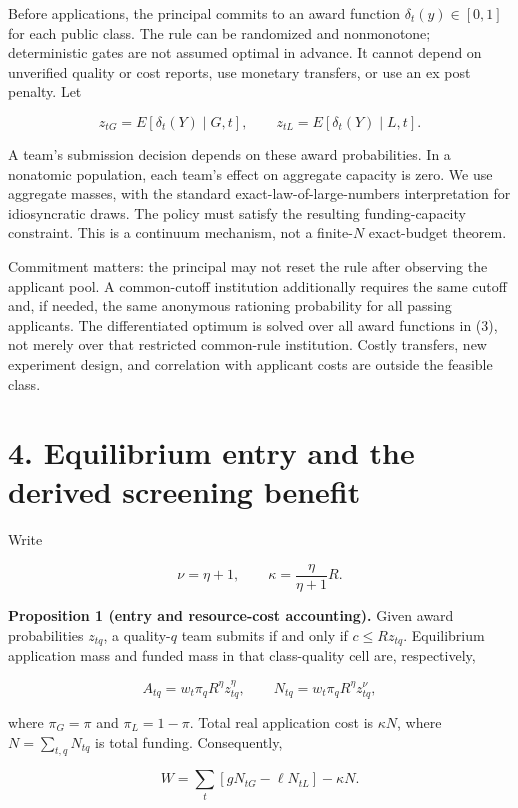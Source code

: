 \documentclass[
  11pt,
]{article}
\begin{document}
Before applications, the principal commits to an award function
\(\delta_t(y)\in[0,1]\) for each public class. The rule can be
randomized and nonmonotone; deterministic gates are not assumed optimal
in advance. It cannot depend on unverified quality or cost reports, use
monetary transfers, or use an ex post penalty. Let

\[z_{tG}=E[\delta_t(Y)\mid G,t],\qquad
z_{tL}=E[\delta_t(Y)\mid L,t]. \tag{3}\]

A team's submission decision depends on these award probabilities. In a
nonatomic population, each team's effect on aggregate capacity is zero.
We use aggregate masses, with the standard exact-law-of-large-numbers
interpretation for idiosyncratic draws. The policy must satisfy the
resulting funding-capacity constraint. This is a continuum mechanism,
not a finite-\(N\) exact-budget theorem.

Commitment matters: the principal may not reset the rule after observing
the applicant pool. A common-cutoff institution additionally requires
the same cutoff and, if needed, the same anonymous rationing probability
for all passing applicants. The differentiated optimum is solved over
all award functions in (3), not merely over that restricted common-rule
institution. Costly transfers, new experiment design, and correlation
with applicant costs are outside the feasible class.

\section{4. Equilibrium entry and the derived screening
benefit}\label{equilibrium-entry-and-the-derived-screening-benefit}

Write

\[\nu=\eta+1,\qquad \kappa=\frac{\eta}{\eta+1}R. \tag{4}\]

\textbf{Proposition 1 (entry and resource-cost accounting).} Given award
probabilities \(z_{tq}\), a quality-\(q\) team submits if and only if
\(c\leq Rz_{tq}\). Equilibrium application mass and funded mass in that
class-quality cell are, respectively,

\[A_{tq}=w_t\pi_q R^{\eta}z_{tq}^{\eta},\qquad
N_{tq}=w_t\pi_q R^{\eta}z_{tq}^{\nu}, \tag{5}\]

where \(\pi_G=\pi\) and \(\pi_L=1-\pi\). Total real application cost is
\(\kappa N\), where \(N=\sum_{t,q}N_{tq}\) is total funding.
Consequently,

\[W=\sum_t[gN_{tG}-\ell N_{tL}]-\kappa N. \tag{6}\]
\end{document}
